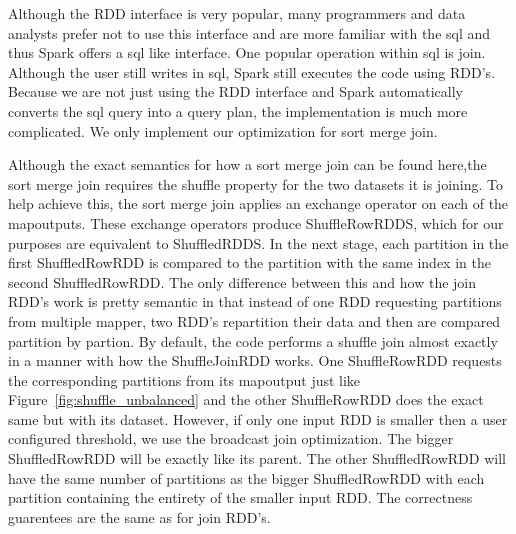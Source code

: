 Although the RDD interface is very popular, many programmers and data analysts prefer not to use this interface
and are more familiar with the sql and thus Spark offers a sql like interface. One popular operation within sql is join.
Although the user still writes in sql, Spark still executes the code using RDD's.\\

Because we are not just using the RDD interface and Spark automatically converts the sql query into a query plan,
the implementation is much more complicated. We only implement our optimization for sort merge join.

Although the exact semantics for how a sort merge join can be found here,the sort merge join requires the shuffle property for the two datasets it is joining.
To help achieve this, the sort merge join applies an exchange operator on each of the mapoutputs. These exchange operators produce
ShuffleRowRDDS, which for our purposes are equivalent to ShuffledRDDS. In the next stage, each partition in the first ShuffledRowRDD is compared
to the partition with the same index in the second ShuffledRowRDD. The only difference between this and how the join RDD's work is pretty semantic
in  that instead of one RDD requesting partitions from multiple mapper, two RDD's repartition their data and then are compared partition by partion.
By default, the code performs a shuffle join almost exactly in a manner with how the ShuffleJoinRDD works. One ShuffleRowRDD requests 
the corresponding partitions from its mapoutput just like Figure~\ref{fig:shuffle_unbalanced} and the other ShuffleRowRDD does the exact same but with its dataset.  
However, if only one input RDD is smaller then a user configured threshold, we use the broadcast join optimization. The bigger ShuffledRowRDD will be exactly like its
parent. The other ShuffledRowRDD will have the same number of partitions as the bigger ShuffledRowRDD with each partition containing the entirety of the smaller input RDD. 
The correctness guarentees are the same as for join RDD's.  

